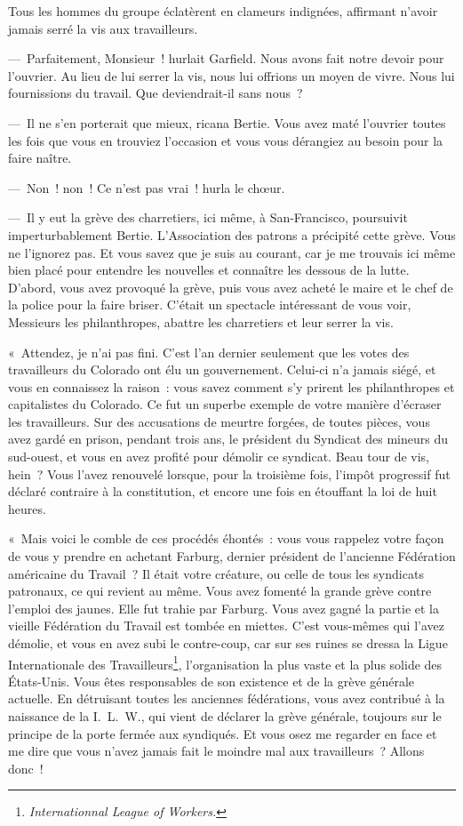 \documentclass[french,twoside]{book} %
\begin{document}
Tous les hommes du groupe éclatèrent en clameurs indignées, affirmant n’avoir jamais serré la vis aux travailleurs.\par
— Parfaitement, Monsieur ! hurlait Garfield. Nous avons fait notre devoir pour l’ouvrier. Au lieu de lui serrer la vis, nous lui offrions un moyen de vivre. Nous lui fournissions du travail. Que deviendrait-il sans nous ?\par
— Il ne s’en porterait que mieux, ricana Bertie. Vous avez maté l’ouvrier toutes les fois que vous en trouviez l’occasion et vous vous dérangiez au besoin pour la faire naître.\par
— Non ! non ! Ce n’est pas vrai ! hurla le chœur.\par
— Il y eut la grève des charretiers, ici même, à San-Francisco, poursuivit imperturbablement Bertie. L’Association des patrons a précipité cette grève. Vous ne l’ignorez pas. Et vous savez que je suis au courant, car je me trouvais ici même bien placé pour entendre les nouvelles et connaître les dessous de la lutte. D’abord, vous avez provoqué la grève, puis vous avez acheté le maire et le chef de la police pour la faire briser. C’était un spectacle intéressant de vous voir, Messieurs les philanthropes, abattre les charretiers et leur serrer la vis.\par
« Attendez, je n’ai pas fini. C’est l’an dernier seulement que les votes des travailleurs du Colorado ont élu un gouvernement. Celui-ci n’a jamais siégé, et vous en connaissez la raison : vous savez comment s’y prirent les philanthropes et capitalistes du Colorado. Ce fut un superbe exemple de votre manière d’écraser les travailleurs. Sur des accusations de meurtre forgées, de toutes pièces, vous avez gardé en prison, pendant trois ans, le président du Syndicat des mineurs du sud-ouest, et vous en avez profité pour démolir ce syndicat. Beau tour de vis, hein ? Vous l’avez renouvelé lorsque, pour la troisième fois, l’impôt progressif fut déclaré contraire à la constitution, et encore une fois en étouffant la loi de huit heures.\par
« Mais voici le comble de ces procédés éhontés : vous vous rappelez votre façon de vous y prendre en achetant Farburg, dernier président de l’ancienne Fédération américaine du Travail ? Il était votre créature, ou celle de tous les syndicats patronaux, ce qui revient au même. Vous avez fomenté la grande grève contre l’emploi des jaunes. Elle fut trahie par Farburg. Vous avez gagné la partie et la vieille Fédération du Travail est tombée en miettes. C’est vous-mêmes qui l’avez démolie, et vous en avez subi le contre-coup, car sur ses ruines se dressa la Ligue Internationale des Travailleurs\footnote{\emph{Internationnal League of Workers.}}, l’organisation la plus vaste et la plus solide des États-Unis. Vous êtes responsables de son existence et de la grève générale actuelle. En détruisant toutes les anciennes fédérations, vous avez contribué à la naissance de la I. L. W., qui vient de déclarer la grève générale, toujours sur le principe de la porte fermée aux syndiqués. Et vous osez me regarder en face et me dire que vous n’avez jamais fait le moindre mal aux travailleurs ? Allons donc !\par
\end{document}
